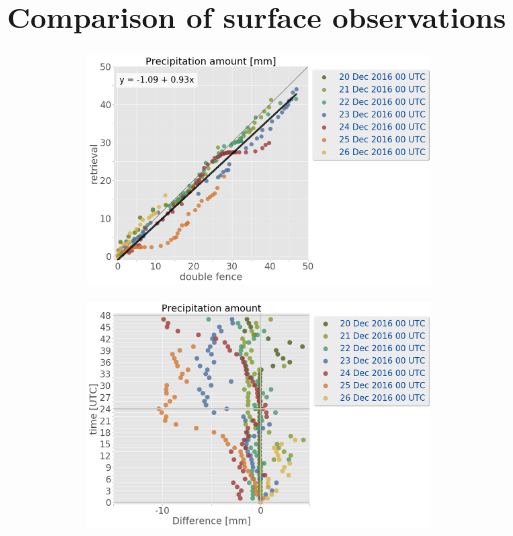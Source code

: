 \section{Comparison of surface observations} 
\begin{figure}[t]
	\centering
	\begin{subfigure}[b]{0.38\textwidth}
		\includegraphics[trim={0.cm 0.cm 13cm 0cm},clip,
		width=\textwidth]{./fig_obs_ret/obs_ret_20161220_26_00}
		\caption{}\label{fig:res:obs_ret_scatter}
	\end{subfigure}
	\begin{subfigure}[b]{0.59\textwidth}
		\includegraphics[trim={0.cm 0.cm 0cm 0cm},clip,
		width=\textwidth]{./fig_obs_ret/diff_20161220_26_00}
		\caption{}\label{fig:res:diff_ret_scatter}
	\end{subfigure}

\end{figure}

